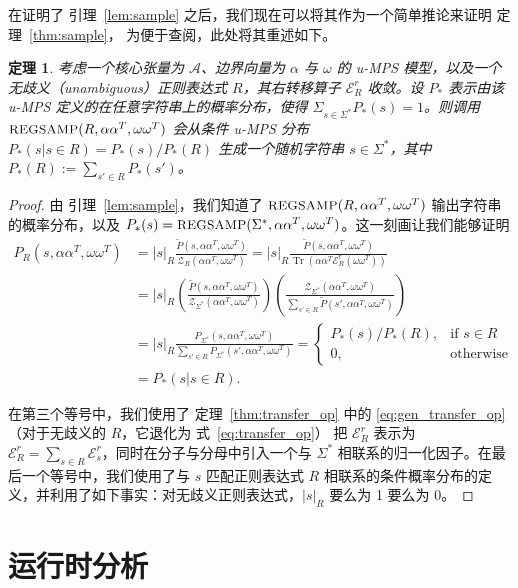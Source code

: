 \documentclass[twoside]{article}
\newtheorem*{theorem*}{定理}
\newcommand{\Sample}{\textsc{\small REGSAMP}}
\DeclareMathOperator{\Tr}{Tr}
\newcommand{\ER}{\mc{E}^{\scriptstyle r}}
\newcommand{\sR}{|s|_R}
\newcommand{\Pt}{\tilde{P}}
\newcommand{\alphamat}{\alpha\alpha^T}
\newcommand{\omegamat}{\omega\omega^T}
\newcommand{\mc}[1]{\mathcal{#1}}
\begin{document}
在证明了 引理~\ref{lem:sample} 之后，我们现在可以将其作为一个简单推论来证明 定理~\ref{thm:sample}，
为便于查阅，此处将其重述如下。

\begin{theorem*}
考虑一个核心张量为 $\mc{A}$、边界向量为 $\alpha$ 与 $\omega$ 的 u-MPS 模型，以及一个无歧义（unambiguous）正则表达式 $R$，其右转移算子 $\ER_R$ 收敛。设 $P_*$ 表示由该 u-MPS 定义的在任意字符串上的概率分布，使得 $\Sigma_{s\in\Sigma^*} P_*(s) = 1$。则调用 $\Sample(R, \alphamat, \omegamat)$ 会从条件 u-MPS 分布 $P_*(s | s \in R) = P_*(s) / P_*(R)$ 生成一个随机字符串 $s \in \Sigma^*$，其中 $P_*(R) := \sum_{s' \in R} P_*(s')$。
\end{theorem*}

\begin{proof}

由 引理~\ref{lem:sample}，我们知道了 $\Sample(R, \alphamat, \omegamat)$ 输出字符串的概率分布，以及 $P_*(s) = \Sample(\Sigma^*, \alphamat, \omegamat)$。这一刻画让我们能够证明
%
\begin{align*}
    P_R(s, \alphamat, \omegamat) &= \sR \frac{\Pt(s, \alphamat, \omegamat)}{\mc{Z}_R(\alphamat, \omegamat)} = \sR \frac{\Pt(s, \alphamat, \omegamat)}{\Tr(\alphamat \ER_R(\omegamat))} \\
    &= \sR \left( \frac{\Pt(s, \alphamat, \omegamat)}{\mc{Z}_{\Sigma^*}(\alphamat, \omegamat)} \right) \left( \frac{\mc{Z}_{\Sigma^*}(\alphamat, \omegamat)}{\sum_{s' \in R} \Pt(s', \alphamat, \omegamat)} \right) \\
    &= \sR \frac{P_{\Sigma^*}(s, \alphamat, \omegamat)}{\sum_{s' \in R} P_{\Sigma^*}(s', \alphamat, \omegamat)} =
    \begin{cases}
    P_*(s) / P_*(R), &\text{if } s \in R\\
    0, &\text{otherwise}
    \end{cases} \\
    &= P_*(s | s \in R).
\end{align*}

在第三个等号中，我们使用了 定理~\ref{thm:transfer_op} 中的 \eqref{eq:gen_transfer_op}（对于无歧义的 $R$，它退化为 式~\eqref{eq:transfer_op}）
把 $\ER_R$ 表示为 $\ER_R = \sum_{s \in R} \ER_s$，同时在分子与分母中引入一个与 $\Sigma^*$ 相联系的归一化因子。在最后一个等号中，我们使用了与 $s$ 匹配正则表达式 $R$ 相联系的条件概率分布的定义，并利用了如下事实：对无歧义正则表达式，$\sR$ 要么为 1 要么为 0。

\end{proof}

\section{运行时分析}
\label{sec:appendix_c}
\end{document}
